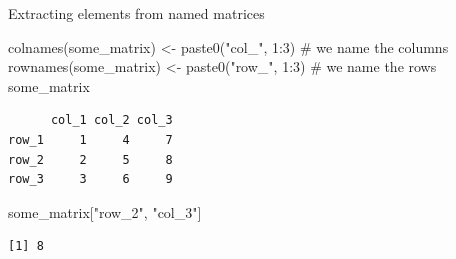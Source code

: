 \documentclass[
  ignorenonframetext,
  aspectratio=169,
]{beamer}
\newenvironment{Shaded}{\begin{snugshade}}{\end{snugshade}}
\newcommand{\CommentTok}[1]{\textcolor[rgb]{0.37,0.37,0.37}{#1}}
\newcommand{\DecValTok}[1]{\textcolor[rgb]{0.68,0.00,0.00}{#1}}
\newcommand{\FunctionTok}[1]{\textcolor[rgb]{0.28,0.35,0.67}{#1}}
\newcommand{\NormalTok}[1]{\textcolor[rgb]{0.00,0.23,0.31}{#1}}
\newcommand{\OtherTok}[1]{\textcolor[rgb]{0.00,0.23,0.31}{#1}}
\newcommand{\SpecialCharTok}[1]{\textcolor[rgb]{0.37,0.37,0.37}{#1}}
\newcommand{\StringTok}[1]{\textcolor[rgb]{0.13,0.47,0.30}{#1}}
\begin{document}
\begin{frame}[fragile]{Extracting elements from named matrices}
\protect{}\label{extracting-elements-from-named-matrices}
\footnotesize

\begin{Shaded}
\begin{Highlighting}[]
\FunctionTok{colnames}\NormalTok{(some\_matrix) }\OtherTok{\textless{}{-}} \FunctionTok{paste0}\NormalTok{(}\StringTok{"col\_"}\NormalTok{, }\DecValTok{1}\SpecialCharTok{:}\DecValTok{3}\NormalTok{) }\CommentTok{\# we name the columns}
\FunctionTok{rownames}\NormalTok{(some\_matrix) }\OtherTok{\textless{}{-}} \FunctionTok{paste0}\NormalTok{(}\StringTok{"row\_"}\NormalTok{, }\DecValTok{1}\SpecialCharTok{:}\DecValTok{3}\NormalTok{) }\CommentTok{\# we name the rows}
\NormalTok{some\_matrix}
\end{Highlighting}
\end{Shaded}

\begin{verbatim}
      col_1 col_2 col_3
row_1     1     4     7
row_2     2     5     8
row_3     3     6     9
\end{verbatim}

\begin{Shaded}
\begin{Highlighting}[]
\NormalTok{some\_matrix[}\StringTok{"row\_2"}\NormalTok{, }\StringTok{"col\_3"}\NormalTok{]}
\end{Highlighting}
\end{Shaded}

\begin{verbatim}
[1] 8
\end{verbatim}

\normalsize
\end{frame}
\end{document}
